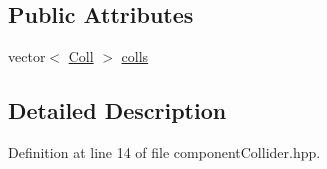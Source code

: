 \subsection*{Public Attributes}
\begin{DoxyCompactItemize}
\item 
vector$<$ \hyperlink{struct_comp_collider_1_1_coll}{Coll} $>$ \hyperlink{class_comp_collider_afbe419c64a502f82423753d755d27bf5}{colls}
\end{DoxyCompactItemize}


\subsection{Detailed Description}


Definition at line 14 of file component\-Collider.\-hpp.



